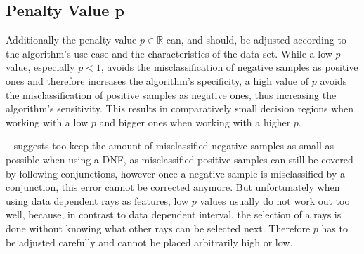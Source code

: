 \subsection{Penalty Value p}

Additionally the penalty value \(p\in \mathbb{R}\) can, and should, be adjusted according to the algorithm's use case and the characteristics of the data set.
While a low \(p\) value, especially \(p < 1\), avoids the misclassification of negative samples as positive ones and therefore increases the algorithm's specificity,
a high value of \(p\) avoids the misclassification of positive samples as negative ones, thus increasing the algorithm's sensitivity.
This results in comparatively small decision regions when working with a low \(p\) and bigger ones when working with a higher \(p\).

~\cite{haussler88} suggests too keep the amount of misclassified negative samples as small as possible when using a DNF,
as misclassified positive samples can still be covered by following conjunctions, however once a negative sample is misclassified by
a conjunction, this error cannot be corrected anymore.
But unfortunately when using data dependent rays as features, low \(p\) values usually do not work out too well,
because, in contrast to data dependent interval, the selection of a rays is done without knowing what other rays can be selected next.
Therefore \(p\) has to be adjusted carefully and cannot be placed arbitrarily high or low.


